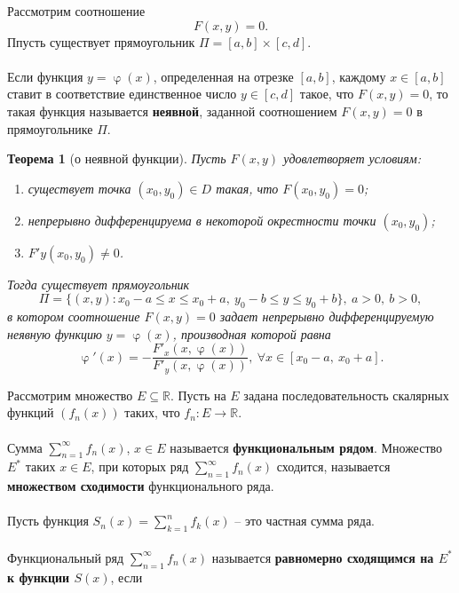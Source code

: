 \documentclass[a4paper, 12pt]{report}
\numberwithin{equation}{section}
\renewcommand{\leq}{\leqslant}
\renewcommand{\varphi}{\upvarphi}
\newtheorem*{theorem}{Теорема}
\begin{document}
	Рассмотрим соотношение
	\begin{equation}
		F(x,y) = 0.
	\end{equation}
	Ппусть существует прямоугольник $\Pi = [a,b]\times [c,d]$.
	\\\\
	{Если функция $y=\varphi(x)$, определенная на отрезке $[a,b]$, каждому $x \in [a,b]$ ставит в соответствие единственное число $y \in [c,d]$ такое, что $F(x,y) = 0$, то такая функция называется \textbf{неявной}, заданной соотношением $F(x,y) = 0$ в прямоугольнике $\Pi$.}
	\begin{theorem}
		[о неявной функции]
		Пусть $F(x,y)$ удовлетворяет условиям:
		\begin{enumerate}
			\item существует точка $(x_0, y_0)\in D$ такая, что $F(x_0, y_0) = 0$;
			\item непрерывно дифференцируема в некоторой окрестности точки $(x_0, y_0)$;
			\item $F'y(x_0,y_0)\ne 0$.
		\end{enumerate}
		Тогда существует прямоугольник
		\begin{equation*}
			\Pi = \{(x,y) : x_0 -a \leq x \leq x_0 + a,\ y_0 - b\leq y \leq y_0+b\},\ a>0,\ b>0,
		\end{equation*}
		в котором соотношение $F(x,y)=0$ задает непрерывно дифференцируемую неявную функцию $y = \varphi(x)$, производная которой равна
		\begin{equation}
			\varphi'(x) = -\dfrac{F'_x(x,\varphi(x))}{F'_y(x,\varphi(x))},\ \forall x \in [x_0-a,\ x_0+a].
		\end{equation}
	\end{theorem}
	\noindent
	Рассмотрим множество $E \subseteq \mathbb R$. Пусть на $E$ задана последовательность скалярных функций $(f_n(x))$ таких, что $f_n:E \to \mathbb R$. 
	\\\\
	{Сумма $\sum_{n=1}^\infty f_n(x)$, $x \in E$ называется \textbf{функциональным рядом}. Множество $E^*$ таких $x\in E$, при которых ряд $\sum_{n=1}^\infty f_n(x)$ сходится, называется \textbf{множеством сходимости} функционального ряда.}
	\\\\
	Пусть функция $S_n(x) = \sum_{k=1}^n f_k(x)$ -- это частная сумма ряда. 
	\\\\
	{Функциональный ряд $\sum_{n=1}^\infty f_n(x)$ называется \textbf{равномерно сходящимся на $E^*$ к функции $S(x)$}, если}
\end{document}
